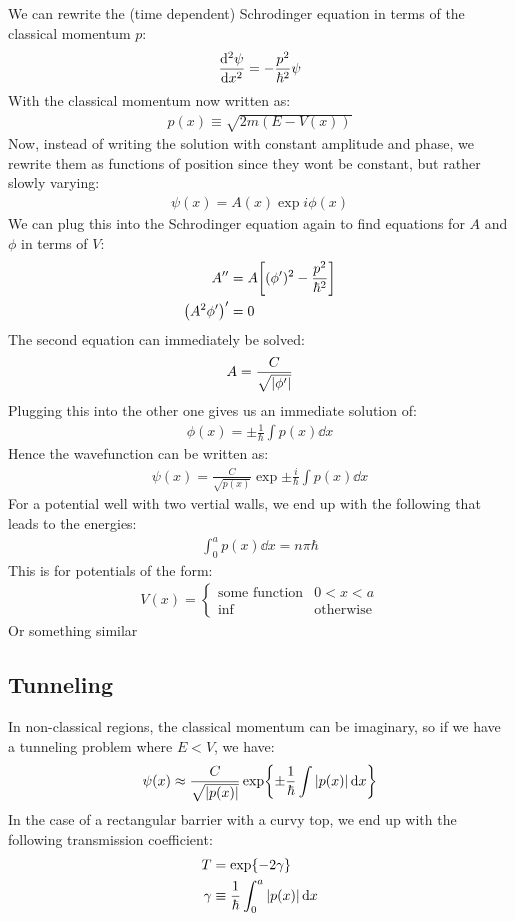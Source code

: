 We can rewrite the (time dependent) Schrodinger equation in terms of the classical momentum $p$:
\begin{align*}
  \dv[2]{\psi}{x}=-\frac{p^2}{\hbar^2}\psi
\end{align*}
With the classical momentum now written as:
\begin{align*}
  p(x)\equiv\sqrt{2m(E-V(x))}
\end{align*}
Now, instead of writing the solution with constant amplitude and phase, we rewrite them as functions of position since they wont be constant, but rather slowly varying:
\begin{align*}
  \psi(x)=A(x)\exp{i\phi(x)}
\end{align*}
We can plug this into the Schrodinger equation again to find equations for $A$ and $\phi$ in terms of $V$:
\begin{align*}
  A''&=A\qty[(\phi')^2-\frac{p^2}{\hbar^2}]\\
  \qty(A^2\phi')'&=0
\end{align*}
The second equation can immediately be solved:
\begin{align*}
  A=\frac{C}{\sqrt{\abs{\phi'}}}
\end{align*}
Plugging this into the other one gives us an immediate solution of:
\begin{align*}
  \phi(x)=\pm\frac{1}{\hbar}\int p(x)\dd{x}
\end{align*}
Hence the wavefunction can be written as:
\begin{align*}
  \psi(x)=\frac{C}{\sqrt{p(x)}}\exp{\pm\frac{i}{\hbar}\int p(x)\dd{x}}
\end{align*}
For a potential well with two vertial walls, we end up with the following that leads to the energies:
\begin{align*}
  \int_0^ap(x)\dd{x}=n\pi\hbar
\end{align*}
This is for potentials of the form:
\begin{align*}
  V(x)=
  \begin{cases}
    \text{some function} & 0<x<a\\
    \inf & \text{otherwise}
  \end{cases}
\end{align*}
Or something similar
\subsection{Tunneling}
In non-classical regions, the classical momentum can be imaginary, so if we have a tunneling problem where $E<V$, we have:
\begin{align*}
  \psi(x)\approx\frac{C}{\sqrt{\abs{p(x)}}}\exp{\pm\frac{1}{\hbar}\int\abs{p(x)}\dd{x}}
\end{align*}
In the case of a rectangular barrier with a curvy top, we end up with the following transmission coefficient:
\begin{align*}
  T&=\exp{-2\gamma}\\
  \gamma&\equiv\frac{1}{\hbar}\int_0^a\abs{p(x)}\dd{x}
\end{align*}
